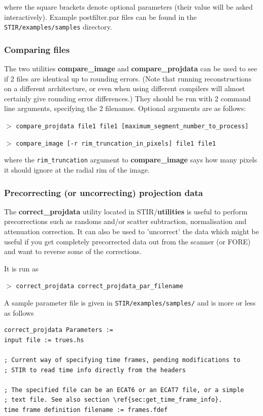 \documentclass{article}
\newcommand{\cmdline}[1]{\par \noindent $>$ \texttt{#1}\par}
\begin{document}
{{where the square brackets denote optional parameters (their value 
will be asked interactively). Example postfilter.par files can 
be found in the \texttt{STIR/examples/samples} directory.


\subsubsection{
Comparing files}

The two utilities \textbf{compare\_image} and \textbf{compare\_projdata} 
can be used to see if 2 files are identical up to rounding errors. 
(Note that running reconstructions on a different architecture, 
or even when using different compilers will almost certainly 
give rounding error differences.) They should be run with 2 command 
line arguments, specifying the 2 filenames. Optional arguments 
are as follows:
\cmdline{compare\_projdata file1 file1 
[maximum\_segment\_number\_to\_process]}
\cmdline{compare\_image [-r rim\_truncation\_in\_pixels] file1 file1}


where the \texttt{rim\_truncation} argument to \textbf{compare\_image}  says 
how many pixels it should ignore at the radial rim of the image.



\subsubsection{
Precorrecting (or uncorrecting) projection data}

The \textbf{correct\_projdata} utility located in STIR/\textbf{utilities} 
is useful to perform precorrections such as randoms and/or scatter 
subtraction, normalisation and attenuation correction. It can 
also be used to 'uncorrect' the data which might be useful if 
you get completely precorrected data out from the scanner (or 
FORE) and want to reverse some of the corrections.


It is run as
\cmdline{correct\_projdata correct\_projdata\_par\_filename}


A sample parameter file is given in \texttt{STIR/examples/samples/} and 
is more or less as follows

\begin{verbatim}
correct_projdata Parameters := 
input file := trues.hs

; Current way of specifying time frames, pending modifications to
; STIR to read time info directly from the headers

; The specified file can be an ECAT6 or an ECAT7 file, or a simple
; text file. See also section \ref{sec:get_time_frame_info}. 
time frame definition filename := frames.fdef


\end{verbatim}}}
\end{document}
